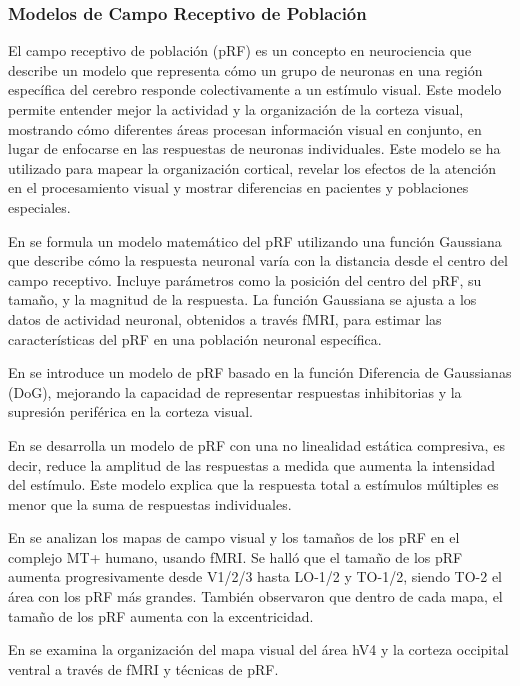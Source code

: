 \subsubsection*{Modelos de Campo Receptivo de Población} 

El campo receptivo de población (pRF) es un concepto en neurociencia que describe un modelo que representa cómo un grupo de neuronas en una región específica del cerebro responde colectivamente a un estímulo visual. Este modelo permite entender mejor la actividad y la organización de la corteza visual, mostrando cómo diferentes áreas procesan información visual en conjunto, en lugar de enfocarse en las respuestas de neuronas individuales. Este modelo se ha utilizado para mapear la organización cortical,  revelar los efectos de la atención en el procesamiento visual y  mostrar diferencias en pacientes y poblaciones especiales.

En \cite{dumoulin_population_2008} se formula un modelo matemático del pRF utilizando una función Gaussiana que describe cómo la respuesta neuronal varía con la distancia desde el centro del campo receptivo. Incluye parámetros como la posición del centro del pRF, su tamaño, y la magnitud de la respuesta. La función Gaussiana se ajusta a los datos de actividad neuronal, obtenidos a través fMRI, para estimar las características del pRF en una población neuronal específica.

En \cite{zuiderbaan_modeling_2012} se introduce un modelo de pRF basado en la función Diferencia de Gaussianas (DoG), mejorando la capacidad de representar respuestas inhibitorias y la supresión periférica en la corteza visual.

En \cite{kay_compressive_2013} se desarrolla un modelo de pRF con una no linealidad estática compresiva, es decir, reduce la amplitud de las respuestas a medida que aumenta la intensidad del estímulo. Este modelo explica que la respuesta total a estímulos múltiples es menor que la suma de respuestas individuales.

En \cite{amano_visual_2009} se analizan los mapas de campo visual y los tamaños de los pRF en el complejo MT+ humano, usando fMRI. Se hall\'o que el tamaño de los pRF aumenta progresivamente desde V1/2/3 hasta LO-1/2 y TO-1/2, siendo TO-2 el área con los pRF más grandes. También observaron que dentro de cada mapa, el tamaño de los pRF aumenta con la excentricidad. 

En \cite{winawer_mapping_2010} se examina la organización del mapa visual del \'area hV4 y la corteza occipital ventral a trav\'es de fMRI y técnicas de pRF. 

